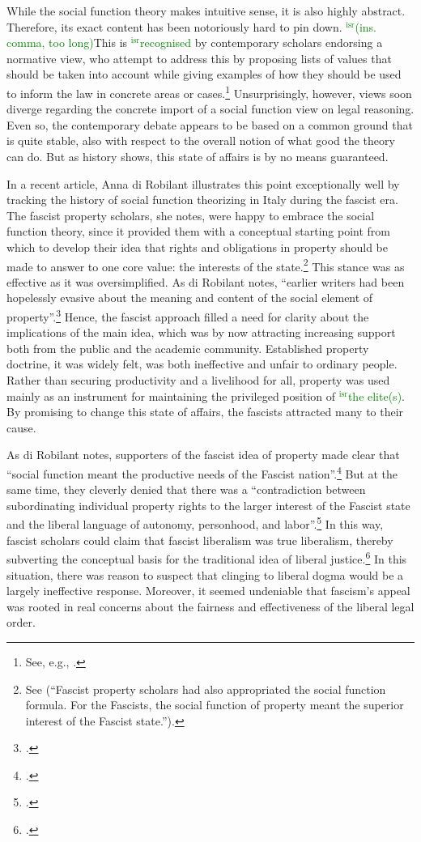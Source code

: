\documentclass[12pt,a4paper]{book} %
\newcommand{\isr}[1]{\textcolor{green}{$^{\textrm{isr}}${#1}}}
\begin{document}
While the social function theory makes intuitive sense, it is also highly abstract. Therefore, its exact content has been notoriously hard to pin down. \isr{(ins. comma, too long)}This is \isr{recognised} by contemporary scholars endorsing a normative view, who attempt to address this by proposing lists of values that should be taken into account while giving examples of how they should be used to inform the law in concrete areas or cases.\footnote{See, e.g., \cite{alexander14,alexander11,dagan07}.} Unsurprisingly, however, views soon diverge regarding the concrete import of a social function view on legal reasoning. Even so, the contemporary debate appears to be based on a common ground that is quite stable, also with respect to the overall notion of what good the theory can do. But as history shows, this state of affairs is by no means guaranteed. 

In a recent article, Anna di Robilant illustrates this point exceptionally well by tracking the history of social function theorizing in Italy during the fascist era. The fascist property scholars, she notes, were happy to embrace the social function theory, since it provided them with a conceptual starting point from which to develop their idea that rights and obligations in property should be made to answer to one core value: the interests of the state.\footnote{See \cite[908-909]{robilant13} (``Fascist property scholars had also appropriated the social function formula. For the Fascists, the social function of property meant the superior interest of the Fascist state.'').} This stance was as effective as it was oversimplified. As di Robilant notes, ``earlier writers had been hopelessly evasive about the meaning and content of the social element of property''.\footcite[909]{robilant13} Hence, the fascist approach filled a need for clarity about the implications of the main idea, which was by now attracting increasing support both from the public and the academic community. Established property doctrine, it was widely felt, was both ineffective and unfair to ordinary people. Rather than securing productivity and a livelihood for all, property was used mainly as an instrument for maintaining the privileged position of \isr{the elite(s)}. By promising to change this state of affairs, the fascists attracted many to their cause.

As di Robilant notes, supporters of the fascist idea of property made clear that ``social function meant the productive needs of the Fascist nation''.\footcite[909]{robilant13} But at the same time, they cleverly denied that there was a ``contradiction between subordinating individual property rights to the larger interest of the Fascist state and the liberal language of autonomy, personhood, and labor''.\footcite[900]{robilant13} In this way, fascist scholars could claim that fascist liberalism was true liberalism, thereby subverting the conceptual basis for the traditional idea of liberal justice.\footcite[900]{robilant13} In this situation, there was reason to suspect that clinging to liberal dogma would be a largely ineffective response. Moreover, it seemed undeniable that fascism's appeal was rooted in real concerns about the fairness and effectiveness of the liberal legal order. 
\end{document}
